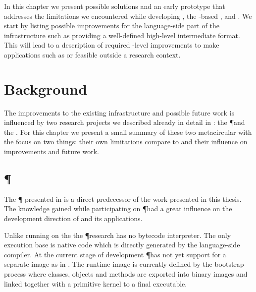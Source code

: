In this chapter we present possible solutions and an early prototype \VM that addresses the limitations we encountered while developing \NB, the \B-based \FFI, \WF and \NBJ.
We start by listing possible improvements for the language-side part of the \B infrastructure such as providing a well-defined high-level intermediate format.
This will lead to a description of required \VM-level improvements to make applications such as \WF or \NBJ feasible outside a research context.

\section{Background}
The improvements to the existing infrastructure \B and possible future work is influenced by two research projects we described already in detail in : the \P \VM and the \Klein \VM.
For this chapter we present a small summary of these two metacircular \VMs with the focus on two things: their own limitations compare to \B and their influence on improvements and future work.


\subsection{\P \VM}

The \P \VM \cite{Verw11a} presented in  is a direct predecessor of the work presented in this thesis.
The knowledge gained while participating on \P had a great influence on the development direction of \B and its applications.

Unlike \PH running on the \Cog \VM the \P research \VM has no bytecode interpreter.
The only execution base is native code which is directly generated by the language-side compiler.
At the current stage of development \P has not yet support for a separate image as in \PH.
The runtime image is currently defined by the bootstrap process where classes, objects and methods are exported into binary images and linked together with a primitive kernel to a final executable.

